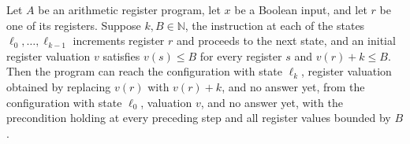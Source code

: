\begin{lemma}
\label{Complexity.LogProg.arm_increments}
\leanok
{}
Let $A$ be an arithmetic register program, let $x$ be a Boolean input, and let $r$ be
one of its registers. Suppose $k,B\in\mathbb{N}$, the instruction at each of the states
$\ell_0,\ldots,\ell_{k-1}$ increments register $r$ and proceeds to the next state, and
an initial register valuation $v$ satisfies $v(s)\le B$ for every register $s$ and
$v(r)+k\le B$. Then the program can reach the configuration with state $\ell_k$,
register valuation obtained by replacing $v(r)$ with $v(r)+k$, and no answer yet, from
the configuration with state $\ell_0$, valuation $v$, and no answer yet, with the
precondition holding at every preceding step and all register values bounded by $B$.
\end{lemma}

